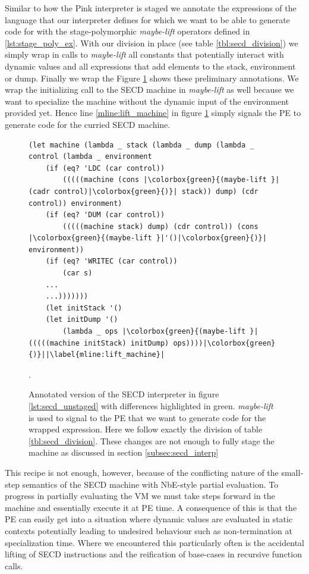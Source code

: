 \documentclass{article}
\theoremstyle{definition}
\begin{document}
Similar to how the Pink interpreter is staged \cite{amin2017collapsing} we annotate the expressions of the language that our interpreter defines for which we want to be able to generate code for with the stage-polymorphic \textit{maybe-lift} operators defined in \ref{lst:stage_poly_ex}. With our division in place (see table \ref{tbl:secd_division}) we simply wrap in calls to \textit{maybe-lift} all constants that potentially interact with dynamic values and all expressions that add elements to the stack, environment or dump. Finally we wrap the  Figure \ref{lst:secd_staged1} shows these preliminary annotations. We wrap the initializing call to the SECD machine in \textit{maybe-lift} as well because we want to specialize the machine without the dynamic input of the environment provided yet. Hence line \ref{mline:lift_machine} in figure \ref{lst:secd_staged1} simply signals the PE to generate code for the curried SECD machine.

\begin{figure}[ht]
\centering
\begin{verbatim}
(let machine (lambda _ stack (lambda _ dump (lambda _ control (lambda _ environment
    (if (eq? 'LDC (car control))
        (((((machine (cons |\colorbox{green}{(maybe-lift }|(cadr control)|\colorbox{green}{)}| stack)) dump) (cdr control)) environment)
    (if (eq? 'DUM (car control))
        (((((machine stack) dump) (cdr control)) (cons |\colorbox{green}{(maybe-lift }|'()|\colorbox{green}{)}| environment))
    (if (eq? 'WRITEC (car control))
        (car s)
    ...
    ...)))))))
    (let initStack '()
    (let initDump '()
        (lambda _ ops |\colorbox{green}{(maybe-lift }|(((((machine initStack) initDump) ops))))|\colorbox{green}{)}||\label{mline:lift_machine}|
\end{verbatim}
\caption{Annotated version of the SECD interpreter in figure \ref{lst:secd_unstaged} with differences highlighted in green. \textit{maybe-lift} is used to signal to the PE that we want to generate code for the wrapped expression. Here we follow exactly the division of table \ref{tbl:secd_division}. These changes are not enough to fully stage the machine as discussed in section \ref{subsec:secd_interp}}.
\label{lst:secd_staged1}
\end{figure}

This recipe is not enough, however, because of the conflicting nature of the small-step semantics of the SECD machine with NbE-style partial evaluation. To progress in partially evaluating the VM we must take steps forward in the machine and essentially execute it at PE time. A consequence of this is that the PE can easily get into a situation where dynamic values are evaluated in static contexts potentially leading to undesired behaviour such as non-termination at specialization time. Where we encountered this particularly often is the accidental lifting of SECD instructions and the reification of base-cases in recursive function calls.
\end{document}
